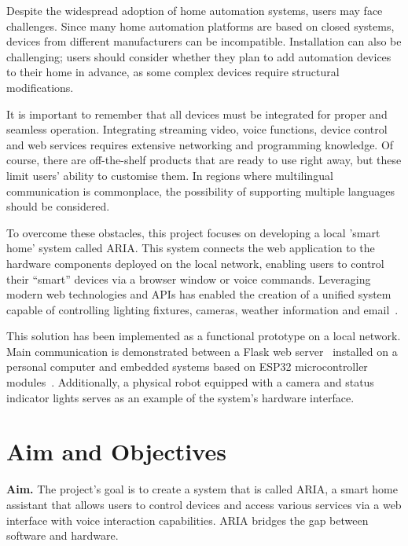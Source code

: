 Despite the widespread adoption of home automation systems, users may face challenges. Since many home automation platforms are based on closed systems, devices from different manufacturers can be incompatible. Installation can also be challenging; users should consider whether they plan to add automation devices to their home in advance, as some complex devices require structural modifications.

It is important to remember that all devices must be integrated for proper and seamless operation. Integrating streaming video, voice functions, device control and web services requires extensive networking and programming knowledge. Of course, there are off-the-shelf products that are ready to use right away, but these limit users' ability to customise them. In regions where multilingual communication is commonplace, the possibility of supporting multiple languages should be considered.

To overcome these obstacles, this project focuses on developing a local 'smart home' system called ARIA. This system connects the web application to the hardware components deployed on the local network, enabling users to control their ``smart'' devices via a browser window or voice commands. Leveraging modern web technologies and APIs has enabled the creation of a unified system capable of controlling lighting fixtures, cameras, weather information and email~\cite{flask,openweather,gmail-api,youtube-api}.

This solution has been implemented as a functional prototype on a local network. Main communication is demonstrated between a Flask web server~\cite{flask} installed on a personal computer and embedded systems based on ESP32 microcontroller modules~\cite{esp-idf}. Additionally, a physical robot equipped with a camera and status indicator lights serves as an example of the system's hardware interface.

\section{Aim and Objectives}

\textbf{Aim.} The project's goal is to create a system that is called ARIA, a smart home assistant that allows users to control devices and access various services via a web interface with voice interaction capabilities. ARIA bridges the gap between software and hardware.


